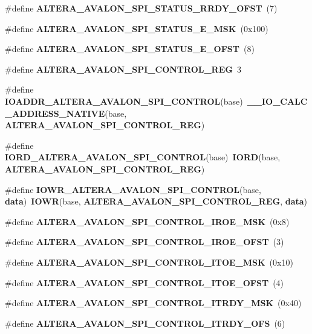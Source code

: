 \begin{DoxyCompactItemize}
\#define {\bf A\+L\+T\+E\+R\+A\+\_\+\+A\+V\+A\+L\+O\+N\+\_\+\+S\+P\+I\+\_\+\+S\+T\+A\+T\+U\+S\+\_\+\+R\+R\+D\+Y\+\_\+\+O\+F\+ST}~(7)
\item 
\#define {\bf A\+L\+T\+E\+R\+A\+\_\+\+A\+V\+A\+L\+O\+N\+\_\+\+S\+P\+I\+\_\+\+S\+T\+A\+T\+U\+S\+\_\+\+E\+\_\+\+M\+SK}~(0x100)
\item 
\#define {\bf A\+L\+T\+E\+R\+A\+\_\+\+A\+V\+A\+L\+O\+N\+\_\+\+S\+P\+I\+\_\+\+S\+T\+A\+T\+U\+S\+\_\+\+E\+\_\+\+O\+F\+ST}~(8)
\item 
\#define {\bf A\+L\+T\+E\+R\+A\+\_\+\+A\+V\+A\+L\+O\+N\+\_\+\+S\+P\+I\+\_\+\+C\+O\+N\+T\+R\+O\+L\+\_\+\+R\+EG}~3
\item 
\#define {\bf I\+O\+A\+D\+D\+R\+\_\+\+A\+L\+T\+E\+R\+A\+\_\+\+A\+V\+A\+L\+O\+N\+\_\+\+S\+P\+I\+\_\+\+C\+O\+N\+T\+R\+OL}(base)~{\bf \+\_\+\+\_\+\+I\+O\+\_\+\+C\+A\+L\+C\+\_\+\+A\+D\+D\+R\+E\+S\+S\+\_\+\+N\+A\+T\+I\+VE}(base, {\bf A\+L\+T\+E\+R\+A\+\_\+\+A\+V\+A\+L\+O\+N\+\_\+\+S\+P\+I\+\_\+\+C\+O\+N\+T\+R\+O\+L\+\_\+\+R\+EG})
\item 
\#define {\bf I\+O\+R\+D\+\_\+\+A\+L\+T\+E\+R\+A\+\_\+\+A\+V\+A\+L\+O\+N\+\_\+\+S\+P\+I\+\_\+\+C\+O\+N\+T\+R\+OL}(base)~{\bf I\+O\+RD}(base, {\bf A\+L\+T\+E\+R\+A\+\_\+\+A\+V\+A\+L\+O\+N\+\_\+\+S\+P\+I\+\_\+\+C\+O\+N\+T\+R\+O\+L\+\_\+\+R\+EG})
\item 
\#define {\bf I\+O\+W\+R\+\_\+\+A\+L\+T\+E\+R\+A\+\_\+\+A\+V\+A\+L\+O\+N\+\_\+\+S\+P\+I\+\_\+\+C\+O\+N\+T\+R\+OL}(base,  {\bf data})~{\bf I\+O\+WR}(base, {\bf A\+L\+T\+E\+R\+A\+\_\+\+A\+V\+A\+L\+O\+N\+\_\+\+S\+P\+I\+\_\+\+C\+O\+N\+T\+R\+O\+L\+\_\+\+R\+EG}, {\bf data})
\item 
\#define {\bf A\+L\+T\+E\+R\+A\+\_\+\+A\+V\+A\+L\+O\+N\+\_\+\+S\+P\+I\+\_\+\+C\+O\+N\+T\+R\+O\+L\+\_\+\+I\+R\+O\+E\+\_\+\+M\+SK}~(0x8)
\item 
\#define {\bf A\+L\+T\+E\+R\+A\+\_\+\+A\+V\+A\+L\+O\+N\+\_\+\+S\+P\+I\+\_\+\+C\+O\+N\+T\+R\+O\+L\+\_\+\+I\+R\+O\+E\+\_\+\+O\+F\+ST}~(3)
\item 
\#define {\bf A\+L\+T\+E\+R\+A\+\_\+\+A\+V\+A\+L\+O\+N\+\_\+\+S\+P\+I\+\_\+\+C\+O\+N\+T\+R\+O\+L\+\_\+\+I\+T\+O\+E\+\_\+\+M\+SK}~(0x10)
\item 
\#define {\bf A\+L\+T\+E\+R\+A\+\_\+\+A\+V\+A\+L\+O\+N\+\_\+\+S\+P\+I\+\_\+\+C\+O\+N\+T\+R\+O\+L\+\_\+\+I\+T\+O\+E\+\_\+\+O\+F\+ST}~(4)
\item 
\#define {\bf A\+L\+T\+E\+R\+A\+\_\+\+A\+V\+A\+L\+O\+N\+\_\+\+S\+P\+I\+\_\+\+C\+O\+N\+T\+R\+O\+L\+\_\+\+I\+T\+R\+D\+Y\+\_\+\+M\+SK}~(0x40)
\item 
\#define {\bf A\+L\+T\+E\+R\+A\+\_\+\+A\+V\+A\+L\+O\+N\+\_\+\+S\+P\+I\+\_\+\+C\+O\+N\+T\+R\+O\+L\+\_\+\+I\+T\+R\+D\+Y\+\_\+\+O\+FS}~(6)

\end{DoxyCompactItemize}
